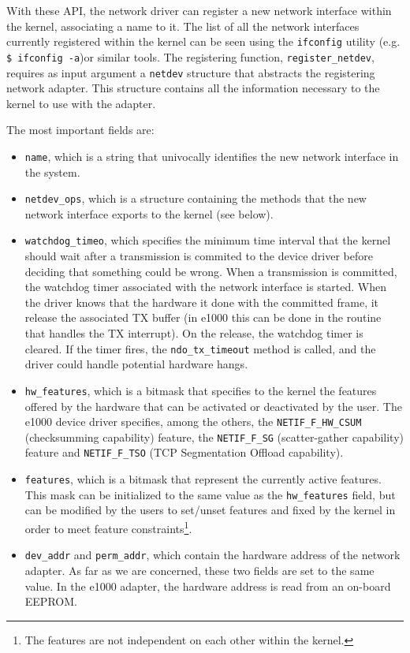 With these API, the network driver can register a new network interface within the kernel, associating a name to it.
The list of all the network interfaces currently registered within the kernel can be seen using the \texttt{ifconfig} utility
(e.g. \texttt{\$ ifconfig -a})or similar tools.
The registering function, \texttt{register\_netdev}, requires as input argument a \texttt{netdev} structure that abstracts the
registering network adapter. This structure contains all the information necessary to the kernel to use with the adapter.

The most important fields are:
\begin{itemize}
    \item \texttt{name}, which is a string that univocally identifies the new network interface in the system.
    
    \item \texttt{netdev\_ops}, which is a structure containing the methods that the new network interface exports to the kernel 
	  (see below).
	  
    \item \texttt{watchdog\_timeo}, which specifies the minimum time interval that the kernel should wait after a transmission is commited
	  to the device driver before deciding that something could be wrong. When a transmission is committed, the watchdog timer 
	  associated with the network interface is started. When the driver knows that the hardware it done with the committed frame,
	  it release the associated TX buffer (in e1000 this can be done in the routine that handles the TX interrupt). On the release,
	  the watchdog timer is cleared. If the timer fires, the \texttt{ndo\_tx\_timeout} method is called, and the driver could
	  handle potential hardware hangs.
	  
    \item \texttt{hw\_features}, which is a bitmask that specifies to the kernel the features offered by the hardware that can be activated
	  or deactivated by the user. The e1000 device driver specifies, among the others, the \texttt{NETIF\_F\_HW\_CSUM} (checksumming
	  capability) feature, the \texttt{NETIF\_F\_SG} (scatter-gather capability) feature and \texttt{NETIF\_F\_TSO} (TCP Segmentation
	  Offload capability).
	  
    \item \texttt{features}, which is a bitmask that represent the currently active features. This mask can be initialized to the same
	  value as the \texttt{hw\_features} field, but can be modified by the users to set/unset features and fixed by the kernel in
	  order to meet feature constraints\footnote{The features are not independent on each other within the kernel.}.
	  
    \item \texttt{dev\_addr} and \texttt{perm\_addr}, which contain the hardware address of the network adapter. As far as we are
	  concerned, these two fields are set to the same value. In the e1000 adapter, the hardware address is read from an on-board
	  EEPROM.
\end{itemize}


